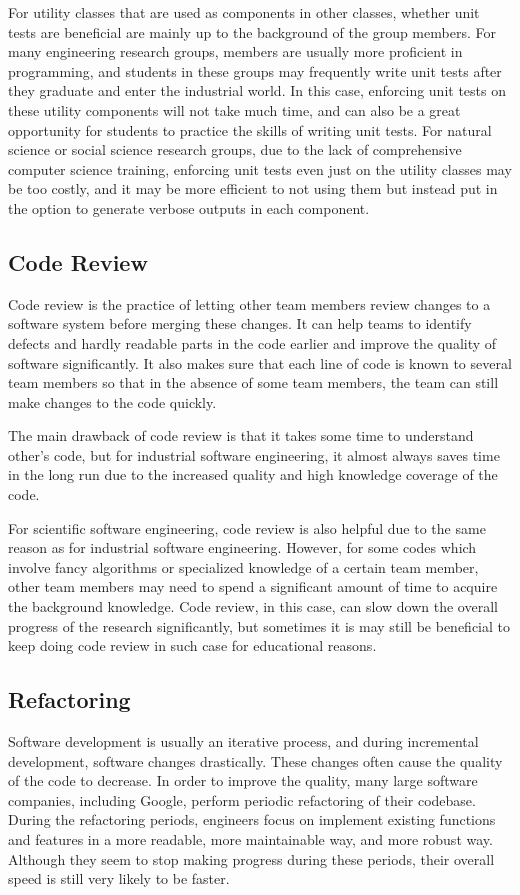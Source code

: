 For utility classes that are used as components in other classes, whether unit tests are beneficial are mainly up to the background of the group members.
For many engineering research groups, members are usually more proficient in programming, and students in these groups may frequently write unit tests after they graduate and enter the industrial world.
In this case, enforcing unit tests on these utility components will not take much time, and can also be a great opportunity for students to practice the skills of writing unit tests.
For natural science or social science research groups, due to the lack of comprehensive computer science training, enforcing unit tests even just on the utility classes may be too costly, and it may be more efficient to not using them but instead put in the option to generate verbose outputs in each component.

\subsection{Code Review}
Code review is the practice of letting other team members review changes to a software system before merging these changes.
It can help teams to identify defects and hardly readable parts in the code earlier and improve the quality of software significantly.
It also makes sure that each line of code is known to several team members so that in the absence of some team members, the team can still make changes to the code quickly.

The main drawback of code review is that it takes some time to understand other's code, but for industrial software engineering, it almost always saves time in the long run due to the increased quality and high knowledge coverage of the code.

For scientific software engineering, code review is also helpful due to the same reason as for industrial software engineering.
However, for some codes which involve fancy algorithms or specialized knowledge of a certain team member, other team members may need to spend a significant amount of time to acquire the background knowledge.
Code review, in this case, can slow down the overall progress of the research significantly, but sometimes it is may still be beneficial to keep doing code review in such case for educational reasons.

\subsection{Refactoring}
Software development is usually an iterative process, and during incremental development, software changes drastically.
These changes often cause the quality of the code to decrease.
In order to improve the quality, many large software companies, including Google, perform periodic refactoring of their codebase.
During the refactoring periods, engineers focus on implement existing functions and features in a more readable, more maintainable way, and more robust way.
Although they seem to stop making progress during these periods, their overall speed is still very likely to be faster.

